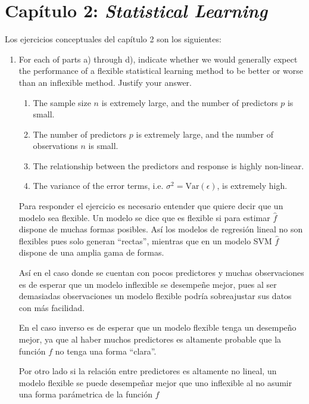 \documentclass[a4paper,11pt]{article}
\begin{document}
\section{Capítulo 2: \textit{Statistical Learning}}
    Los ejercicios conceptuales del capítulo 2 son los siguientes:
    \begin{enumerate}
        \item For each of parts a) through d), indicate whether we would
        generally expect the performance of a ﬂexible statistical learning
        method to be better or worse than an inﬂexible method. Justify your
        answer.
        \begin{enumerate}
            \item The sample size $n$ is extremely large, and the number of
            predictors $p$ is small.
            \item The number of predictors $p$ is extremely large, and the
            number of observations $n$ is small.
            \item The relationship between the predictors and response is highly
            non-linear.
            \item The variance of the error terms, i.e. $
            \sigma^2=\text{Var}(\epsilon)$, is extremely high.
        \end{enumerate}
{\sl
        \begin{shaded}
            Para responder el ejercicio es necesario entender que quiere decir
            que un modelo sea flexible. Un modelo se dice que es flexible si
            para estimar $\hat{f}$ dispone de muchas formas posibles. Así los
            modelos de regresión lineal no son flexibles pues solo generan
            ``rectas'', mientras que en un modelo SVM $\hat{f} $ dispone de una
            amplia gama de formas.
            
            Así en el caso donde se cuentan con pocos predictores y muchas
            observaciones es de esperar que un modelo inflexible se desempeñe
            mejor, pues al ser demasiadas observaciones un modelo flexible
            podría sobreajustar sus datos con más facilidad.
            
            En el caso inverso es de esperar que un modelo flexible tenga un
            desempeño mejor, ya que al haber muchos predictores es altamente
            probable que la función $f$ no tenga una forma ``clara''.
            
            Por otro lado si la relación entre predictores es altamente no
            lineal, un modelo flexible se puede desempeñar mejor que uno
            inflexible al no asumir una forma parámetrica de la función $f$
            

\end{shaded}}
\end{enumerate}
\end{document}
